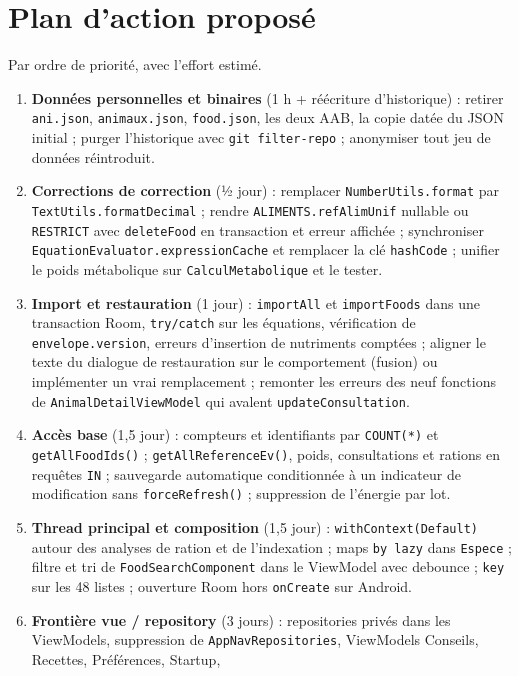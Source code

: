 \documentclass[11pt,a4paper]{article}
\newcommand{\fichier}[1]{\texttt{\small #1}}
\newcommand{\code}[1]{\texttt{#1}}
\newcommand{\sev}[1]{\textbf{#1}}
\begin{document}
\section{Plan d'action proposé}

Par ordre de priorité, avec l'effort estimé.

\begin{enumerate}
\item \sev{Données personnelles et binaires} (1 h + réécriture d'historique) : retirer
  \fichier{ani.json}, \fichier{animaux.json}, \fichier{food.json}, les deux AAB, la copie datée
  du JSON initial ; purger l'historique avec \code{git filter-repo} ; anonymiser tout jeu de
  données réintroduit.
\item \sev{Corrections de correction} (½ jour) : remplacer \code{NumberUtils.format} par
  \code{TextUtils.formatDecimal} ; rendre \code{ALIMENTS.refAlimUnif} nullable ou \code{RESTRICT}
  avec \code{deleteFood} en transaction et erreur affichée ; synchroniser
  \code{EquationEvaluator.expressionCache} et remplacer la clé \code{hashCode} ; unifier le poids
  métabolique sur \code{CalculMetabolique} et le tester.
\item \sev{Import et restauration} (1 jour) : \code{importAll} et \code{importFoods} dans une
  transaction Room, \code{try/catch} sur les équations, vérification de \code{envelope.version},
  erreurs d'insertion de nutriments comptées ; aligner le texte du dialogue de restauration sur le
  comportement (fusion) ou implémenter un vrai remplacement ; remonter les erreurs des neuf
  fonctions de \code{AnimalDetailViewModel} qui avalent \code{updateConsultation}.
\item \sev{Accès base} (1,5 jour) : compteurs et identifiants par \code{COUNT(*)} et
  \code{getAllFoodIds()} ; \code{getAllReferenceEv()}, poids, consultations et rations en requêtes
  \code{IN} ; sauvegarde automatique conditionnée à un indicateur de modification sans
  \code{forceRefresh()} ; suppression de l'énergie par lot.
\item \sev{Thread principal et composition} (1,5 jour) : \code{withContext(Default)} autour des
  analyses de ration et de l'indexation ; maps \code{by lazy} dans \code{Espece} ; filtre et tri de
  \code{FoodSearchComponent} dans le ViewModel avec debounce ; \code{key} sur les 48 listes ;
  ouverture Room hors \code{onCreate} sur Android.
\item \sev{Frontière vue / repository} (3 jours) : repositories privés dans les ViewModels,
  suppression de \code{AppNavRepositories}, ViewModels Conseils, Recettes, Préférences, Startup,

\end{enumerate}
\end{document}
